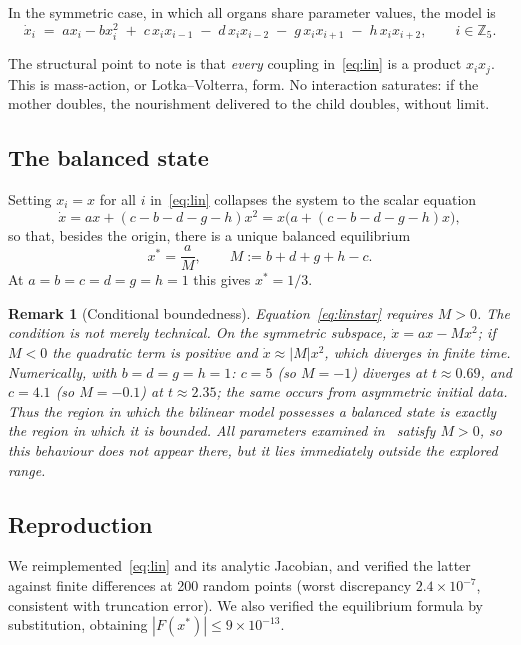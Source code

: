 \documentclass[11pt]{article}
\newcommand{\Z}{{\mathbb{Z}}}
\newtheorem{remark}[theorem]{Remark}
\begin{document}
In the symmetric case, in which all organs share parameter values, the model is
\begin{equation}\label{eq:lin}
\dot x_i \;=\; a x_i - b x_i^2
\;+\; c\,x_i x_{i-1}
\;-\; d\,x_i x_{i-2}
\;-\; g\,x_i x_{i+1}
\;-\; h\,x_i x_{i+2},
\qquad i\in\Z_5 .
\end{equation}

The structural point to note is that \emph{every} coupling in~\eqref{eq:lin} is a
product $x_ix_j$. This is mass-action, or Lotka--Volterra, form. No interaction
saturates: if the mother doubles, the nourishment delivered to the child
doubles, without limit.

\subsection{The balanced state}

Setting $x_i=x$ for all $i$ in~\eqref{eq:lin} collapses the system to the scalar
equation
\[
\dot x = a x + (c-b-d-g-h)x^2 = x\bigl(a + (c-b-d-g-h)x\bigr),
\]
so that, besides the origin, there is a unique balanced equilibrium
\begin{equation}\label{eq:linstar}
x^\ast=\frac{a}{M},\qquad M:=b+d+g+h-c .
\end{equation}
At $a=b=c=d=g=h=1$ this gives $x^\ast=1/3$.

\begin{remark}[Conditional boundedness]\label{rem:blowup}
Equation~\eqref{eq:linstar} requires $M>0$. The condition is not merely
technical. On the symmetric subspace, $\dot x = ax - Mx^2$; if $M<0$ the
quadratic term is \emph{positive} and $\dot x\approx |M|x^2$, which diverges in
finite time. Numerically, with $b=d=g=h=1$: $c=5$ (so $M=-1$) diverges at
$t\approx0.69$, and $c=4.1$ (so $M=-0.1$) at $t\approx2.35$; the same occurs
from asymmetric initial data. Thus the region in which the bilinear model
possesses a balanced state is exactly the region in which it is bounded. All
parameters examined in~\cite{Lin2020} satisfy $M>0$, so this behaviour does not
appear there, but it lies immediately outside the explored range.
\end{remark}

\subsection{Reproduction}

We reimplemented~\eqref{eq:lin} and its analytic Jacobian, and verified the
latter against finite differences at 200 random points (worst discrepancy
$2.4\times10^{-7}$, consistent with truncation error). We also verified the
equilibrium formula by substitution, obtaining $|F(x^\ast)|\le 9\times10^{-13}$.
\end{document}
